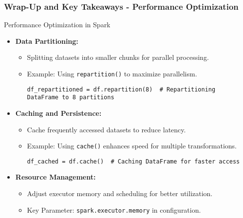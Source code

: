 \documentclass{beamer}
\begin{document}
\begin{frame}[fragile]
    \frametitle{Wrap-Up and Key Takeaways - Performance Optimization}
    \begin{block}{Performance Optimization in Spark}
        \begin{itemize}
            \item \textbf{Data Partitioning:}
                \begin{itemize}
                    \item Splitting datasets into smaller chunks for parallel processing.
                    \item Example: Using \texttt{repartition()} to maximize parallelism.
                    \begin{lstlisting}
df_repartitioned = df.repartition(8)  # Repartitioning DataFrame to 8 partitions
                    \end{lstlisting}
                \end{itemize}
        
            \item \textbf{Caching and Persistence:}
                \begin{itemize}
                    \item Cache frequently accessed datasets to reduce latency.
                    \item Example: Using \texttt{cache()} enhances speed for multiple transformations.
                    \begin{lstlisting}
df_cached = df.cache()  # Caching DataFrame for faster access
                    \end{lstlisting}
                \end{itemize}
        
            \item \textbf{Resource Management:}
                \begin{itemize}
                    \item Adjust executor memory and scheduling for better utilization.
                    \item Key Parameter: \texttt{spark.executor.memory} in configuration.
                \end{itemize}
        \end{itemize}
    \end{block}
\end{frame}
\end{document}

